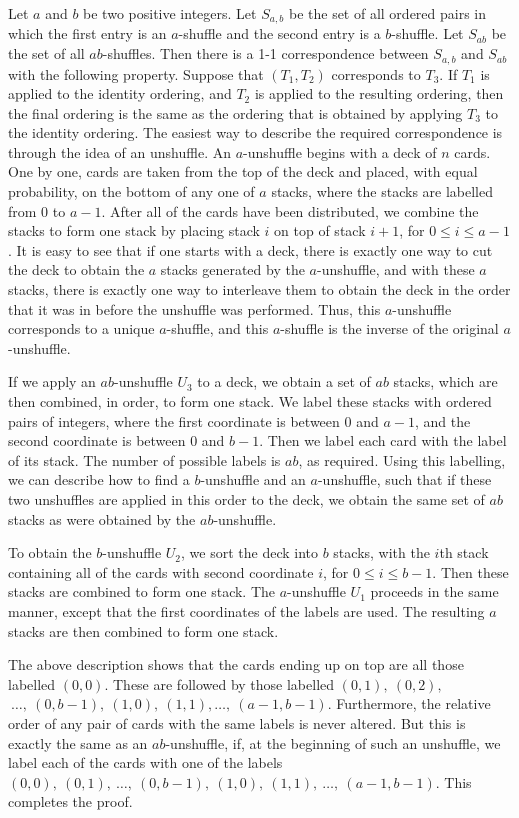 \begin{theorem}\label{thm 3.3.1}  Let $a$ and $b$ be two positive integers.  Let
$S_{a,b}$ be the set of all ordered pairs in which the first entry is an $a$-shuffle
and the second entry is a
$b$-shuffle.  Let $S_{ab}$ be the set of all $ab$-shuffles.  Then there is a 1-1
correspondence between $S_{a,b}$ and $S_{ab}$ with the following property. Suppose
that $(T_1, T_2)$ corresponds to $T_3$.  If $T_1$ is applied to the identity ordering,
and $T_2$ is applied to the resulting ordering, then the final ordering is the same as
the ordering that is obtained by applying $T_3$ to the identity ordering.
\proof The easiest way to describe the required correspondence is through the idea of
an unshuffle.  An $a$-unshuffle begins with a deck of $n$ cards.  One by one, cards
are taken from the top of the deck and placed, with equal probability, on the bottom of any one
of $a$ stacks, where the stacks are labelled from 0 to $a-1$.  After all of the cards
have been distributed, we combine the stacks to form one stack by placing stack $i$ on
top of stack $i+1$, for $0 \le i
\le a-1$.  It is easy to see that if one starts with a deck, there is exactly one way
to cut the deck to obtain the $a$ stacks generated by the $a$-unshuffle, and with these
$a$ stacks, there is exactly one way to interleave them to obtain the deck in the
order that it was in before the unshuffle was performed.  Thus, this $a$-unshuffle
corresponds to a unique
$a$-shuffle, and this $a$-shuffle is the inverse of the original $a$-unshuffle.
\par 
If we apply an $ab$-unshuffle $U_3$ to a deck, we obtain a set of $ab$ stacks,
which are then combined, in order, to form one stack.  We label these stacks with
ordered pairs of integers, where the first coordinate is between 0 and $a-1$, and the
second coordinate is between 0 and $b-1$.  Then we label each card with the label of
its stack.  The number of possible labels is $ab$, as required.  Using this labelling, 
we can describe how to find a $b$-unshuffle and an
$a$-unshuffle, such that if these two unshuffles are applied in this order to the
deck, we obtain the same set of $ab$ stacks as were obtained by the $ab$-unshuffle.
\par 
To obtain the $b$-unshuffle $U_2$, we sort the deck into $b$ stacks, with the
$i$th stack containing all of the cards with second coordinate $i$, for $0 \le i \le
b-1$.  Then these stacks are combined to form one stack.  The $a$-unshuffle $U_1$
proceeds in the same manner, except that the first coordinates of the labels are
used.  The resulting $a$ stacks are then combined to form one stack. 
\par The above description shows that the cards ending up on top are all those
labelled $(0, 0)$.  These are followed by those labelled $(0, 1),\ (0, 2),$ $\  
\ldots,\ (0, b - 1),\ (1, 0),\ (1,1),\ldots,\ (a-1, b-1)$.  Furthermore, the relative order of any
pair of cards with the same labels is never altered.  But this is exactly the same as an 
$ab$-unshuffle, if, at the beginning of such an unshuffle, we label each of the cards with one of 
the labels $(0, 0),\ (0, 1),\ \ldots,\ (0, b-1),\ (1, 0),\ (1,1),\ \ldots,\ (a-1, b-1)$.  This
completes the proof.
\end{theorem}

